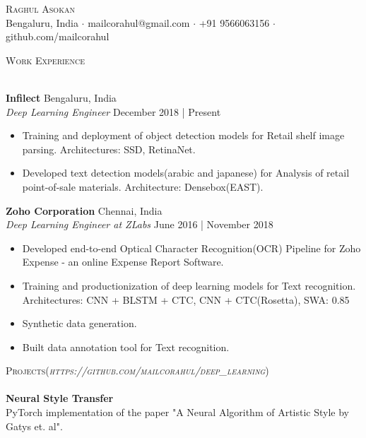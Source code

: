 \documentclass[a4paper]{article}
\newcommand{\lineunder} {
    \vspace*{-8pt} \\
    \hspace*{-18pt} \hrulefill \\
}
\newcommand{\header} [1] {
    {\hspace*{-18pt}\vspace*{6pt} \textsc{#1}}
    \vspace*{-6pt} \lineunder
}
\begin{document}
\vspace*{-40pt}

    

\vspace*{-10pt}
\begin{center}
	{\Huge \scshape {Raghul Asokan}}\\
	Bengaluru, India $\cdot$ mailcorahul@gmail.com $\cdot$ +91 9566063156 $\cdot$ github.com/mailcorahul\\
\end{center}

\header{Work Experience}
\vspace{1mm}

\textbf{Infilect} \hfill Bengaluru, India\\
\textit{Deep Learning Engineer} \hfill December 2018 | Present\\

\begin{itemize}
    \itemsep-0.5em
    \item Training and deployment of object detection models for Retail shelf image parsing. Architectures: SSD, RetinaNet.
    \item Developed text detection models(arabic and japanese) for Analysis of retail point-of-sale materials. Architecture: Densebox(EAST).
\end{itemize}
\vspace*{1mm}

\textbf{Zoho Corporation} \hfill Chennai, India\\
\textit{Deep Learning Engineer at ZLabs} \hfill June 2016 | November 2018\\

\begin{itemize}
    \itemsep-0.5em
    \item Developed end-to-end Optical Character Recognition(OCR) Pipeline for Zoho Expense - an online Expense Report Software.
    \item Training and productionization of deep learning models for Text recognition. Architectures: CNN + BLSTM + CTC, CNN + CTC(Rosetta), SWA: 0.85
    \item Synthetic data generation.
    \item Built data annotation tool for Text recognition.
\end{itemize}

\header{Projects(\textit{https://github.com/mailcorahul/deep\_learning})}
{\textbf{Neural Style Transfer}}\\
PyTorch implementation of the paper "A Neural Algorithm of Artistic Style by Gatys et. al".\\
\vspace*{2mm}
\end{document}
